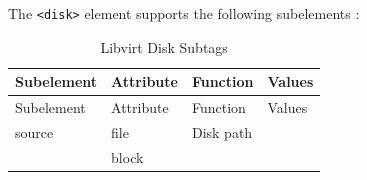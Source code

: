 \documentclass[
  14pt,
  english,
  a4paper,
]{scrreprt}
\begin{document}
The \texttt{\textless{}disk\textgreater{}} element supports the
following subelements :

\hypertarget{tbl:lvirt_disk_subtags}{}
\begin{longtable}[]{@{}llll@{}}
\caption{\label{tbl:lvirt_disk_subtags}Libvirt Disk
Subtags}\tabularnewline
\toprule
\begin{minipage}[b]{0.16\columnwidth}\raggedright
Subelement\strut
\end{minipage} & \begin{minipage}[b]{0.14\columnwidth}\raggedright
Attribute\strut
\end{minipage} & \begin{minipage}[b]{0.31\columnwidth}\raggedright
Function\strut
\end{minipage} & \begin{minipage}[b]{0.28\columnwidth}\raggedright
Values\strut
\end{minipage}\tabularnewline
\midrule
\endfirsthead
\toprule
\begin{minipage}[b]{0.16\columnwidth}\raggedright
Subelement\strut
\end{minipage} & \begin{minipage}[b]{0.14\columnwidth}\raggedright
Attribute\strut
\end{minipage} & \begin{minipage}[b]{0.31\columnwidth}\raggedright
Function\strut
\end{minipage} & \begin{minipage}[b]{0.28\columnwidth}\raggedright
Values\strut
\end{minipage}\tabularnewline
\midrule
\endhead
\begin{minipage}[t]{0.16\columnwidth}\raggedright
source\strut
\end{minipage} & \begin{minipage}[t]{0.14\columnwidth}\raggedright
file\strut
\end{minipage} & \begin{minipage}[t]{0.31\columnwidth}\raggedright
Disk path\strut
\end{minipage} & \begin{minipage}[t]{0.28\columnwidth}\raggedright
\strut
\end{minipage}\tabularnewline
\begin{minipage}[t]{0.16\columnwidth}\raggedright
\strut
\end{minipage} & \begin{minipage}[t]{0.14\columnwidth}\raggedright
block\strut

\end{minipage}
\end{longtable}
\end{document}
